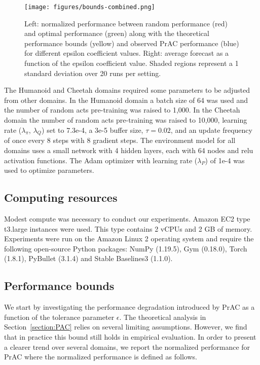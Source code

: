 \documentclass[letterpaper]{article} %
\begin{document}
\begin{figure*}
  \texttt{[image: figures/bounds-combined.png]}
  \caption{Left: normalized performance between random performance (red) and optimal performance (green) along with the theoretical performance bounds (yellow) and observed PrAC performance (blue) for different epsilon coefficient values. Right: average forecast as a function of the epsilon coefficient value. Shaded regions represent a 1 standard deviation over 20 runs per setting.}
  \label{bounds}
\end{figure*}

The Humanoid and Cheetah domains required some parameters to be adjusted from other domains. In the Humanoid domain a batch size of 64 was used and the number of random acts pre-training was raised to 1,000. In the Cheetah domain the number of random acts pre-training was raised to 10,000, learning rate ($\lambda_\pi$, $\lambda_Q$) set to 7.3e-4, a 3e-5 buffer size, $\tau=0.02$, and an update frequency of once every 8 steps with 8 gradient steps.
The environment model for all domains uses a small network with 4 hidden layers, each with 64 nodes and relu activation functions. The Adam optimizer with learning rate ($\lambda_P$) of 1e-4 was used to optimize parameters.



\subsection{Computing resources}

Modest compute was necessary to conduct our experiments. Amazon EC2 type t3.large instances were used. This type contains 2 vCPUs and 2 GB of memory. Experiments were run on the Amazon Linux 2 operating system and require the following open-source Python packages: NumPy (1.19.5), Gym (0.18.0), Torch (1.8.1), PyBullet (3.1.4) and Stable Baselines3 (1.1.0).

\subsection{Performance bounds}

We start by investigating the performance degradation introduced by PrAC as a function of the tolerance parameter $\epsilon$. The theoretical analysis in Section~\ref{section:PAC} relies on several limiting assumptions. However, we find that in practice this bound still holds in empirical evaluation. In order to present a clearer trend over several domains, we report the normalized performance for PrAC where the normalized performance is defined as follows.
\end{document}
